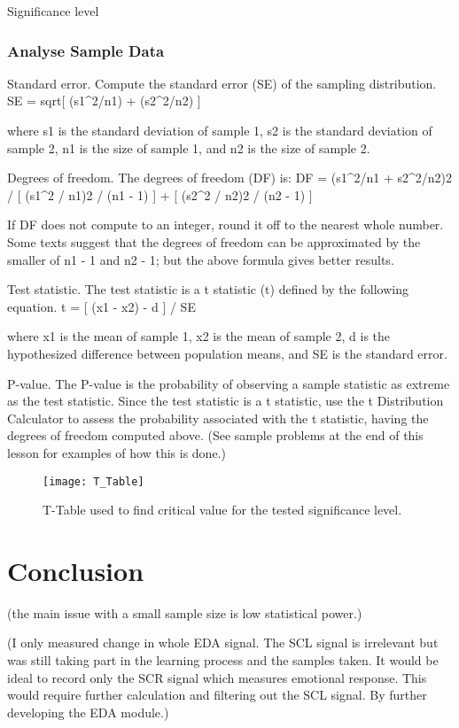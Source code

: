 \documentclass{report}
\begin{document}
Significance level

\subsection{Analyse Sample Data}

Standard error. Compute the standard error (SE) of the sampling distribution.
SE = sqrt[ (s1^2/n1) + (s2^2/n2) ]

where s1 is the standard deviation of sample 1, s2 is the standard deviation of sample 2, n1 is the size of sample 1, and n2 is the size of sample 2.

Degrees of freedom. The degrees of freedom (DF) is:
DF = (s1^2/n1 + s2^2/n2)2 / { [ (s1^2 / n1)2 / (n1 - 1) ] + [ (s2^2 / n2)2 / (n2 - 1) ] }

If DF does not compute to an integer, round it off to the nearest whole number. Some texts suggest that the degrees of freedom can be approximated by the smaller of n1 - 1 and n2 - 1; but the above formula gives better results.

Test statistic. The test statistic is a t statistic (t) defined by the following equation.
t = [ (x1 - x2) - d ] / SE

where x1 is the mean of sample 1, x2 is the mean of sample 2, d is the hypothesized difference between population means, and SE is the standard error.

P-value. The P-value is the probability of observing a sample statistic as extreme as the test statistic. Since the test statistic is a t statistic, use the t Distribution Calculator to assess the probability associated with the t statistic, having the degrees of freedom computed above. (See sample problems at the end of this lesson for examples of how this is done.)


\begin{figure}
\centerline{\texttt{[image: T\_Table]}}
\caption[T-Table for critical value]{}
\label{fgr:tt}
\centerline{T-Table used to find critical value for the tested significance level.}
\end{figure}
\cite{T2014Table}

\chapter{Conclusion}

(the main issue with a small sample size is low statistical power.)

(I only measured change in whole EDA signal. The SCL signal is irrelevant but was still taking part in the learning process and the samples taken. It would be ideal to
record only the SCR signal which measures emotional response. This would require further calculation and filtering out the SCL signal. By further developing the EDA module.)
\end{document}
